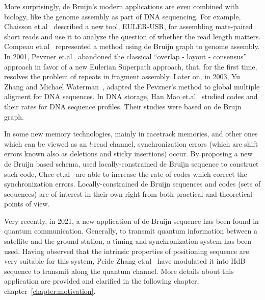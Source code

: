 More surprisingly, de Bruijn's modern applications are even combined with biology, like the genome assembly as part of DNA sequencing. For example, Chaisson et.al~\cite{chaisson2009novo} described a new tool, EULER-USR, for assembling mate-paired short reads and use it to analyze the question of whether the read length matters. Compeau et.al~\cite{compeau2011apply} represented a method using de Bruijn graph to genome assembly. In 2001, Pevzner et.al~\cite{pevzner2001new} abandoned the classical “overlap - layout - consensus” approach in favor of a new Eulerian Superpath approach, that, for the first time, resolves the problem of repeats in fragment assembly. Later on, in 2003, Yu Zhang and Michael Waterman~\cite{zhang2003eulerian}, adapted the Pevzner's method to global multiple aligment for DNA sequences. In DNA storage, Han Mao et.al~\cite{chang2017rates,kiah2016codes} studied codes and their rates for DNA sequence profiles. Their studies were based on de Brujn graph.

In some new memory technologies, mainly in racetrack memories, and other ones which can be viewed as an $l$-read channel, synchronization errors (which are shift errors known also as deletions and sticky insertions) occur. By proposing a new de Bruijn based schema, used locally-constrained de Bruijn sequence to construct such code, Chee et.al~\cite{chee2021locally} are able to increase the rate of codes which correct the synchronization errors. Locally-constrained de Bruijn sequences and codes (sets of sequences) are of interest in their own right from both practical and theoretical points of view.

Very recently, in 2021, a new application of de Bruijn sequence has been found in quantum communication. Generally, to transmit quantum information between a satellite and the ground station, a timing and synchronization system has been used. Having observed that the intrinsic properties of positioning sequence are very suitable for this system, Peide Zhang et.al~\cite{zhang2021timing} have modulated it into \gls{HdB} sequence to transmit along the quantum channel. More details about this application are provided and clarified in the following chapter, chapter~\ref{chapter:motivation}.

